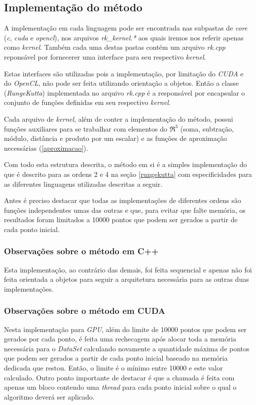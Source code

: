   \subsection{Implementação do método}
  A implementação em cada linguagem pode ser encontrada nas subpastas de \textit{core} (\textit{c}, \textit{cuda} e \textit{opencl}), nos arquivos \textit{rk\_kernel.*} aos quais iremos nos referir apenas como \textit{kernel}. Também cada uma destas pastas contém um arquivo \textit{rk.cpp} reponsável por fornecerer uma interface para seu respectivo \textit{kernel}.
  
  Estas interfaces são utilizadas pois a implementação, por limitação do \textit{CUDA} e do \textit{OpenCL}, não pode ser feita utilizando orientação a objetos. Então a classe (\textit{RungeKutta}) implementada no arquivo \textit{rk.cpp} é a responsável por encapsular o conjunto de funções definidas em seu respectivo \textit{kernel}.

  Cada arquivo de \textit{kernel}, além de conter a implementação do método, possui funções auxiliares para se trabalhar com elementos do $\Re ^{3}$ (soma, subtração, módulo, distância e produto por um escalar) e as funções de aproximação necessárias (\ref{aproximacao}).
  
  Com todo esta estrutura descrita, o método em si é a simples implementação do que é descrito para as ordens 2 e 4 na seção \ref{rungekutta} com especificidades para as diferentes linguagens utilizadas descritas a seguir.
  
  Antes é preciso destacar que todas as implementações de diferentes ordens são funções independentes umas das outras e que, para evitar que falte memória, os resultados foram limitados a 10000 pontos que podem ser gerados a partir de cada ponto inicial.
  
    \subsubsection{Observações sobre o método em C++}
    Esta implementação, ao contrário das demais, foi feita sequencial e apenas não foi feita orientada a objetos para seguir a arquitetura necessária para as outras duas implementações.
    
    \subsubsection{Observações sobre o método em CUDA}
    Nesta implementação para \textit{GPU}, além do limite de 10000 pontos que podem ser gerados por cada ponto, é feita uma rechecagem após alocar toda a memória necessária para o \textit{DataSet} calculando novamente a quantidade máxima de pontos que podem ser gerados a partir de cada ponto inicial baseado na memória dedicada que restou. Então, o limite é o mínimo entre 10000 e este valor calculado.
    Outro ponto importante de destacar é que a chamada é feita com apenas um bloco contendo uma \textit{thread} para cada ponto inicial sobre o qual o algoritmo deverá ser aplicado.
    
